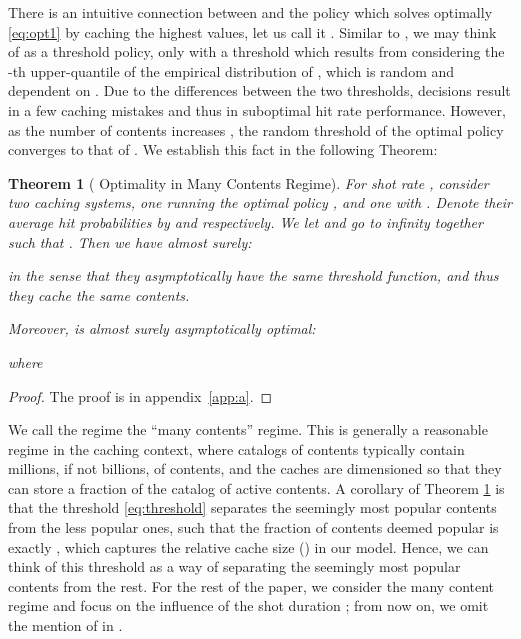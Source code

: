 \documentclass[10pt, conference, letterpaper]{IEEEtran}
\newtheorem{theorem}{Theorem}
\begin{document}
There is an intuitive connection between  and the policy which solves optimally \eqref{eq:opt1} by caching the highest  values, let us call it . Similar to , we may think of  as a threshold policy, only with a threshold 
which results from considering the -th upper-quantile of the empirical distribution of , which is random and dependent on . 
Due to the differences between the two thresholds,   decisions result in a few caching mistakes and thus in suboptimal hit rate performance. 
However, as the number of contents increases , the random threshold of the optimal policy converges to that of . We establish this fact in the following Theorem:




\begin{theorem}[ Optimality in  Many Contents Regime]\label{th:ABT}
For shot rate , consider two caching systems, one running the optimal policy , and one with . Denote their average hit probabilities by  and  respectively.
We let  and  go to infinity together such that . 
Then we have almost surely: \vspace{-0.09in}

in the sense that they asymptotically have the same threshold function, and thus they cache the same contents. 

Moreover,  is almost surely asymptotically optimal:

where \vspace{-0.08in}

\end{theorem}
\begin{proof}
The proof is in appendix~\ref{app:a}.
\end{proof}



We call the regime  the ``many contents'' regime. 
This is generally a reasonable regime in the caching context, where catalogs of contents typically contain millions, if not billions, of contents, and the caches are dimensioned so that they can store a fraction of the catalog of active contents.
A corollary of Theorem \ref{th:ABT} is that the threshold \eqref{eq:threshold} separates the seemingly most popular contents from the less popular ones, such that the fraction of contents deemed popular is exactly , which captures the relative cache size () in our model. Hence, we can think of this threshold as a way of separating the  seemingly most popular contents from the rest. For the rest of the paper, we consider the many content regime and focus on the influence of the shot duration ; from now on, we omit the mention of  in .
\end{document}
